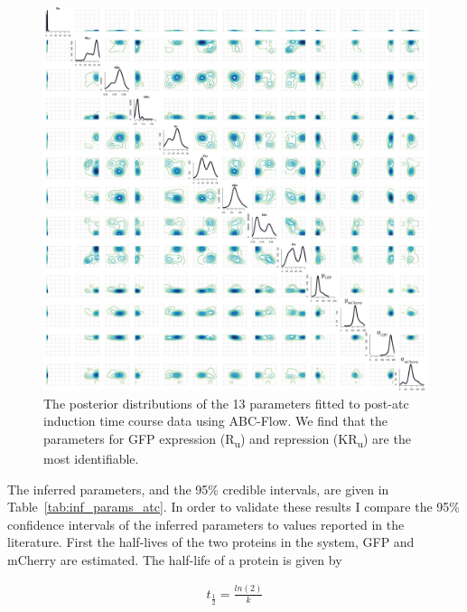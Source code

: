 \begin{figure}[tb]
\centerfloat
	\includegraphics[width=1.1\textwidth]{../../chapters/chapterABCFlow/images/posterior_atc.png}
	\caption[Posterior distribution of inferred parameters for post-\acrshort{atc} induction of the toggle switch]{\label{fig:1atc-post} The posterior distributions of the 13 parameters fitted to post-\acrshort{atc} induction time course data using ABC-Flow. We find that the parameters for GFP expression (R\textsubscript{u}) and repression (KR\textsubscript{u}) are the most identifiable.}
\end{figure}




The inferred parameters, and the 95\% credible intervals, are given in Table~\ref{tab:inf_params_atc}. In order to validate these results I compare the 95\% confidence intervals of the inferred parameters to values reported in the literature. First the half-lives of the two proteins in the system, GFP and mCherry are estimated. The half-life of a protein is given by 

\begin{align*}
	t_{\frac{1}{2}} = \frac{ln(2)}{k}
\end{align*}

